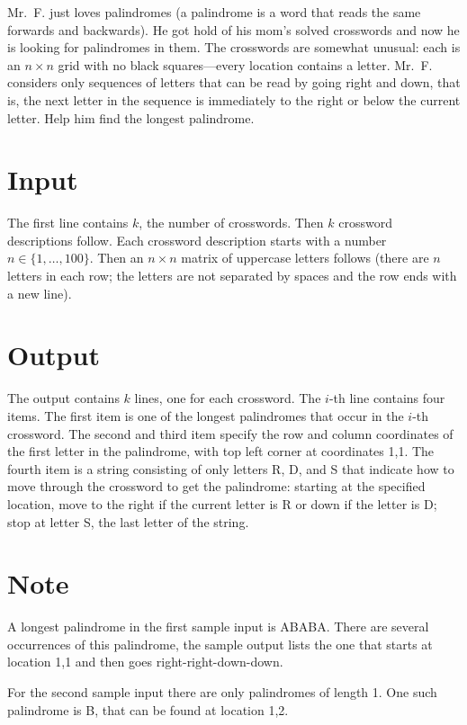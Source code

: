 
Mr.~F. just loves palindromes (a palindrome is a word that reads the same
forwards and backwards). He got hold of his mom's solved
crosswords and now he is looking for palindromes in them. The crosswords are somewhat unusual: each is an $n\times n$ grid with no black squares---every location contains a letter. Mr.~F.
considers only sequences of letters that can be read by going
right and down, that is, the next letter in the sequence
is immediately to the right or below the current letter. Help him find the
longest palindrome.

\section*{Input}
The first line contains $k$, the number of crosswords. Then $k$
crossword descriptions follow. Each crossword description starts
with a number $n\in\{1,\dots,100\}$. Then an $n\times n$ matrix
of uppercase letters follows (there are $n$ letters in each
row; the letters are not separated by spaces and the row ends with a new line).


\section*{Output}
The output contains $k$ lines, one for each crossword. The $i$-th
line contains four items. The first item is one of the longest palindromes that occur in the $i$-th crossword.
The second and third item specify the row and column coordinates of the first letter in the palindrome, with top left corner at coordinates 1,1.
The fourth item is a string consisting of only letters R, D, and S that indicate how to move through the crossword to get the palindrome:
starting at the specified location, move to the right if the current letter is R or down if the letter is D; stop at letter S, the last letter of the string.


\section*{Note}
A longest palindrome in the first sample input is ABABA. There are several occurrences of this palindrome, the sample output lists the one that starts at location 1,1 and then goes right-right-down-down.

For the second sample input there are only palindromes of length 1. One such palindrome is B, that can be found at location 1,2.

